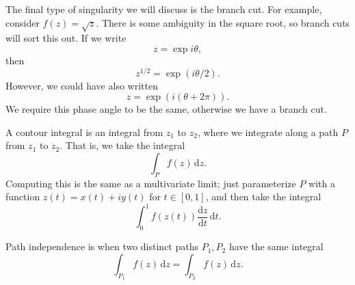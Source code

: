 The final type of singularity we will discuss is the branch cut. For example, consider $f(z)=\sqrt{z} $. There is some ambiguity in the square root, so branch cuts will sort this out. If we write
\[
	z=\exp i\theta 
,\]
then
\[
	z^{1/2} =\exp (i\theta /2)
.\]
However, we could have also written
\[
	z=\exp (i\left( \theta +2\pi  \right) )
.\]
We require this phase angle to be the same, otherwise we have a branch cut.

A contour integral is an integral from $z_1$ to $z_2$, where we integrate along a path $P$ from $z_1$ to $z_2$. That is, we take the integral
\[
	\int_{P} f(z) \,\mathrm{d} z
.\]
Computing this is the same as a multivariate limit; just parameterize $P$ with a function $z(t)=x(t)+iy(t)$ for $t\in[0,1]$, and then take the integral
\[
	\int_{0}^{1} f(z(t)) \frac{\mathrm{d}z}{\mathrm{d}t} \,\mathrm{d} t
.\]

Path independence is when two distinct paths $P_1,P_2$ have the same integral
\[
	\int_{P_1} f(z) \,\mathrm{d} z=\int_{P_2} f(z) \,\mathrm{d} z
.\]

